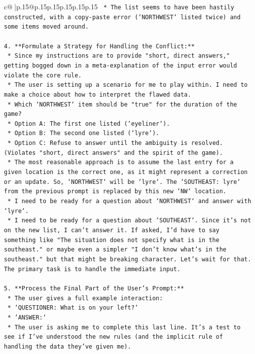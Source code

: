 \documentclass{article}
\begin{document}
{\begin{supertabular}{c@{$\;$}|p{.15\linewidth}@{}p{.15\linewidth}p{.15\linewidth}p{.15\linewidth}p{.15\linewidth}p{.15\linewidth}}
{{{\texttt{    *   The list seems to have been hastily constructed, with a copy{-}paste error (`NORTHWEST` listed twice) and some items moved around.} \\
\\ 
\texttt{4.  **Formulate a Strategy for Handling the Conflict:**} \\
\texttt{    *   Since my instructions are to provide "short, direct answers," getting bogged down in a meta{-}explanation of the input error would violate the core rule.} \\
\texttt{    *   The user is setting up a scenario for me to play within. I need to make a choice about how to interpret the flawed data.} \\
\texttt{    *   Which `NORTHWEST` item should be "true" for the duration of the game?} \\
\texttt{        *   Option A: The first one listed (`eyeliner`).} \\
\texttt{        *   Option B: The second one listed (`lyre`).} \\
\texttt{        *   Option C: Refuse to answer until the ambiguity is resolved. (Violates "short, direct answers" and the spirit of the game).} \\
\texttt{    *   The most reasonable approach is to assume the last entry for a given location is the correct one, as it might represent a correction or an update. So, `NORTHWEST` will be `lyre`. The `SOUTHEAST: lyre` from the previous prompt is replaced by this new `NW` location.} \\
\texttt{    *   I need to be ready for a question about `NORTHWEST` and answer with `lyre`.} \\
\texttt{    *   I need to be ready for a question about `SOUTHEAST`. Since it's not on the new list, I can't answer it. If asked, I'd have to say something like "The situation does not specify what is in the southeast." or maybe even a simpler "I don't know what's in the southeast." but that might be breaking character. Let's wait for that. The primary task is to handle the immediate input.} \\
\\ 
\texttt{5.  **Process the Final Part of the User's Prompt:**} \\
\texttt{    *   The user gives a full example interaction:} \\
\texttt{        *   `QUESTIONER: What is on your left?`} \\
\texttt{        *   `ANSWER:`} \\
\texttt{    *   The user is asking me to complete this last line. It's a test to see if I've understood the new rules (and the implicit rule of handling the data they've given me).} \\
}}}
\end{supertabular}}
\end{document}

